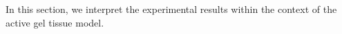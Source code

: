 In this section, we interpret the experimental results within the context of the active gel tissue model. %
